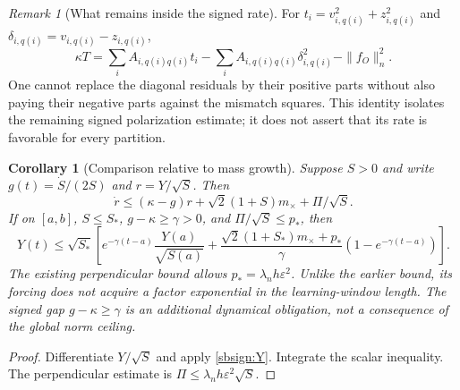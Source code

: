 \documentclass{article} %
\theoremstyle{plain}
\newtheorem{corollary}[theorem]{Corollary}
\theoremstyle{definition}
\theoremstyle{remark}
\newtheorem{remark}[theorem]{Remark}
\begin{document}
\begin{remark}[What remains inside the signed rate]
For $t_i=v_{i,q(i)}^2+z_{i,q(i)}^2$ and
$\delta_{i,q(i)}=v_{i,q(i)}-z_{i,q(i)}$,
\[
 \kappa T=\sum_i A_{i,q(i)q(i)}t_i
       -\sum_i A_{i,q(i)q(i)}\delta_{i,q(i)}^2-\|f_O\|_n^2.
\]
One cannot replace the diagonal residuals by their positive parts without
also paying their negative parts against the mismatch squares.
This identity isolates the remaining signed polarization estimate;
it does not assert that its rate is favorable for every partition.
\end{remark}

\begin{corollary}[Comparison relative to mass growth]
\label{sbsign:clock}
Suppose $S>0$ and write $g(t)=\dot S/(2S)$ and $r=Y/\sqrt S$.
Then
\[
 \dot r\le(\kappa-g)r+\sqrt2(1+S)m_\times+\Pi/\sqrt S.
\]
If on $[a,b]$, $S\le S_*$, $g-\kappa\ge\gamma>0$, and
$\Pi/\sqrt S\le p_*$, then
\begin{equation}\label{sbsign:relative}
 Y(t)\le\sqrt{S_*}\left[
 e^{-\gamma(t-a)}\frac{Y(a)}{\sqrt{S(a)}}
 +\frac{\sqrt2(1+S_*)m_\times+p_*}{\gamma}
           (1-e^{-\gamma(t-a)})\right].
\end{equation}
The existing perpendicular bound allows $p_*=\lambda_nh\varepsilon^2$.
Unlike the earlier bound, its forcing does not acquire a factor
exponential in the learning-window length. The signed gap
$g-\kappa\ge\gamma$ is an additional dynamical obligation, not a
consequence of the global norm ceiling.
\end{corollary}
\begin{proof}
Differentiate $Y/\sqrt S$ and apply \eqref{sbsign:Y}. Integrate the scalar
inequality. The perpendicular estimate is
$\Pi\le\lambda_nh\varepsilon^2\sqrt S$.
\end{proof}
\end{document}
